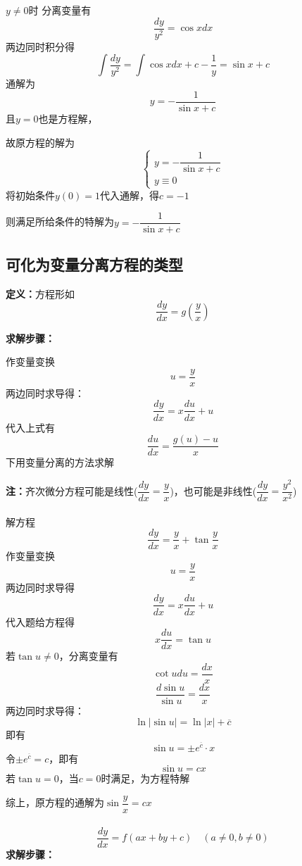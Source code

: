 \documentclass[oneside]{book} %
\begin{document}
\noindent {}
$y \neq 0$时
分离变量有
$$\frac{dy}{y^{2}} = \cos x dx$$
\indent 两边同时积分得
$$\int \dfrac{dy}{y^{2}} = \int \cos x dx + c - \frac{1}{y} = \sin x + c$$
\indent 通解为
$$y = -\dfrac{1}{\sin x + c}$$
\indent 且$y = 0$也是方程解，

故原方程的解为$$
\begin{cases}
    y = -\dfrac{1}{\sin x + c} \\
    y \equiv 0
\end{cases}
$$
\indent 将初始条件$y(0) = 1$代入通解，得$c = -1$

\indent 则满足所给条件的特解为$y = -\dfrac{1}{\sin x + c}$

\subsection*{可化为变量分离方程的类型}
\noindent {}

\noindent \textbf{定义：}方程形如$$\dfrac{dy}{dx} = g\left(\dfrac{y}{x}\right) $$

\noindent \textbf{求解步骤：}

作变量变换
$$u = \frac{y}{x}$$
\indent 两边同时求导得：
$$\frac{dy}{dx} = x \frac{du}{dx} + u$$
\indent 代入上式有
$$\frac{du}{dx} = \frac{g(u) - u}{x}$$
\indent 下用变量分离的方法求解

\textbf{注：}齐次微分方程可能是线性($\dfrac{dy}{dx} = \dfrac{y}{x}$)，也可能是非线性($\dfrac{dy}{dx} = \dfrac{y^{2}}{x^{2}}$)
\\ \hspace*{\fill} \\
解方程
$$\frac{dy}{dx} = \frac{y}{x} + \tan \dfrac{y}{x}$$
作变量变换
$$u = \frac{y}{x}$$
\indent 两边同时求导得
$$\frac{dy}{dx} = x \frac{du}{dx} + u$$
\indent 代入题给方程得
$$x \frac{du}{dx} = \tan u$$
\indent 若$\tan u \neq 0$，分离变量有
$$\cot u du = \frac{dx}{x}$$
$$\frac{d \sin u}{\sin u} = \frac{dx}{x}$$
\indent 两边同时求导得：
$$\ln \left\lvert \sin u\right\rvert = \ln \left\lvert x\right\rvert + \overline{c} $$
\indent 即有
$$\sin u = \pm e^{\overline{c}} \cdot x$$
\indent 令$\pm e^{\overline{c}} = c$，即有
$$\sin u = cx$$
\indent 若$\tan u = 0$，当$c = 0$时满足，为方程特解

综上，原方程的通解为$\sin \dfrac{y}{x} = cx$
\\ \hspace*{\fill} \\
\noindent {}
$$\dfrac{dy}{dx} = f(ax + by + c) \quad (a \neq 0 , b \neq 0)$$
\textbf{求解步骤：}
\end{document}
